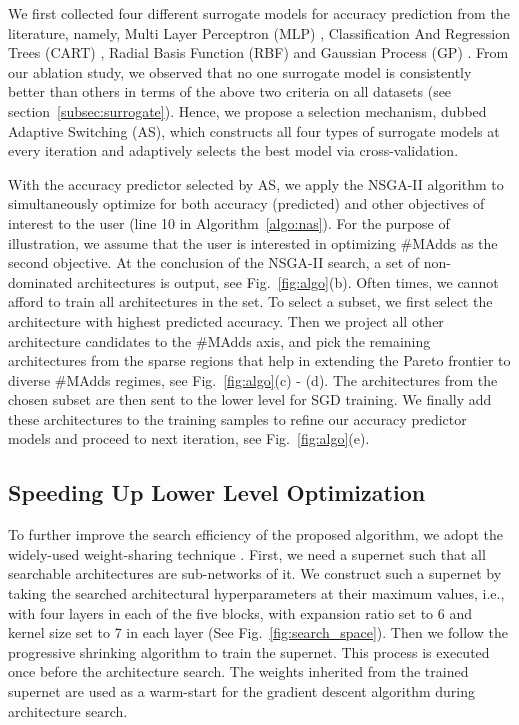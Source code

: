 \documentclass[runningheads]{llncs}
\begin{document}
We first collected four different surrogate models for accuracy prediction from the literature, namely, Multi Layer Perceptron (MLP) \cite{PNAS}, Classification And Regression Trees (CART) \cite{ae-cnn+e2epp}, Radial Basis Function (RBF) \cite{baker2017accelerating} and Gaussian Process (GP) \cite{chamnet}. From our ablation study, we observed that no one surrogate model is consistently better than others in terms of the above two criteria on all datasets (see section~\ref{subsec:surrogate}). Hence, we propose a selection mechanism, dubbed Adaptive Switching (AS), which constructs all four types of surrogate models at every iteration and adaptively selects the best model via cross-validation.

With the accuracy predictor selected by AS, we apply the NSGA-II algorithm to simultaneously optimize for both accuracy (predicted) and other objectives of interest to the user (line 10 in Algorithm~\ref{algo:nas}). For the purpose of illustration, we assume that the user is interested in optimizing \#MAdds as the second objective. At the conclusion of the NSGA-II search, a set of non-dominated architectures is output, see Fig.~\ref{fig:algo}(b). Often times, we cannot afford to train all architectures in the set. To select a subset, we first select the architecture with highest predicted accuracy. Then we project all other architecture candidates to the \#MAdds axis, and pick the remaining architectures from the sparse regions that help in extending the Pareto frontier to diverse \#MAdds regimes, see Fig.~\ref{fig:algo}(c) - (d). The architectures from the chosen subset are then sent to the lower level for SGD training. We finally add these architectures to the training samples to refine our accuracy predictor models and proceed to next iteration, see Fig.~\ref{fig:algo}(e).

\subsection{Speeding Up Lower Level Optimization}
To further improve the search efficiency of the proposed algorithm, we adopt the widely-used weight-sharing technique \cite{smash,luo2018neural,atomnas}. First, we need a supernet such that all searchable architectures are sub-networks of it. We construct such a supernet by taking the searched architectural hyperparameters at their maximum values, i.e., with four layers in each of the five blocks, with expansion ratio set to 6 and kernel size set to 7 in each layer (See Fig.~\ref{fig:search_space}). Then we follow the progressive shrinking algorithm \cite{onceforall} to train the supernet. This process is executed once before the architecture search. The weights inherited from the trained supernet are used as a warm-start for the gradient descent algorithm during architecture search.
\end{document}
